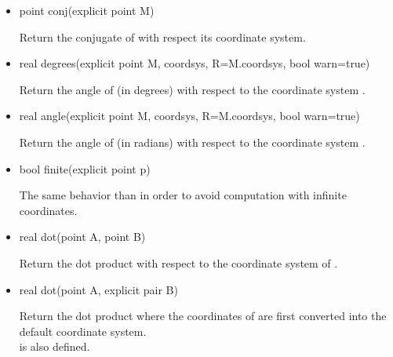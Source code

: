 \documentclass[pdftex]{article}
\begin{document}
\begin{itemize}
\item {}
  \begin{Vcolor}
    point conj(explicit point M)
  \end{Vcolor}
  Return the conjugate of  with respect its coordinate
  system.
\item {}
  \begin{Vcolor}
    real degrees(explicit point M, coordsys,
    R=M.coordsys, bool warn=true)
  \end{Vcolor}
  Return the angle of  (in degrees) with respect to the  coordinate system .
\item {}
  \begin{Vcolor}
    real angle(explicit point M, coordsys,
    R=M.coordsys, bool warn=true)
  \end{Vcolor}
  Return the angle of  (in radians) with respect to the  coordinate system .
\item {}
  \begin{Vcolor}
    bool finite(explicit point p)
  \end{Vcolor}
  The same behavior than  in order to avoid
  computation with infinite coordinates.
\item {}
  \begin{Vcolor}
    real dot(point A, point B)
  \end{Vcolor}
  Return the dot product  with respect to the
  coordinate system of .
\item {}
  \begin{Vcolor}
    real dot(point A, explicit pair B)
  \end{Vcolor}
  Return the dot product   where the coordinates
  of  are first converted into the default coordinate system.\hfill\\
   is also defined.

\end{itemize}

\end{document}
